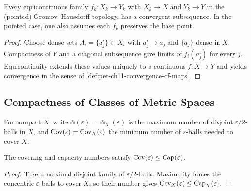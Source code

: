 \begin{lemma}
  \label{lem:pet-ch11-arzela-ascoli-gh}
  Every equicontinuous family $f_k:X_k\to Y_k$ with $X_k\to X$ and $Y_k\to Y$
  in the (pointed) Gromov--Hausdorff topology, has a convergent subsequence.
  In the pointed case, one also assumes each $f_k$ preserves the base point.
\end{lemma}
\begin{proof}
  \sketch
  Choose dense sets \(A_i=\{a_j^i\}\subset X_i\) with \(a_j^i\to a_j\) and \(\{a_j\}\) dense in \(X\). Compactness of \(Y\) and a diagonal subsequence give limits of \(f_i(a_j^i)\) for every \(j\). Equicontinuity extends these values uniquely to a continuous \(f:X\to Y\) and yields convergence in the sense of \cref{def:pet-ch11-convergence-of-maps}.
\end{proof}


\subsection{Compactness of Classes of Metric Spaces}

\begin{definition}
  \label{def:pet-ch11-capacity-covering-functions}
  For compact $X$, write
  $\Cap(\varepsilon)=\Cap_X(\varepsilon)$ is the maximum number of disjoint
  $\varepsilon/2$-balls in $X$, and $\operatorname{Cov}(\varepsilon)=\operatorname{Cov}_X(\varepsilon)$
  the minimum number of $\varepsilon$-balls needed to cover $X$.
\end{definition}

\begin{lemma}
  \label{lem:pet-ch11-cov-le-cap}
  The covering and capacity numbers satisfy
  $\operatorname{Cov}(\varepsilon)\le\operatorname{Cap}(\varepsilon)$.
\end{lemma}
\begin{proof}
  \sketch
  Take a maximal disjoint family of \(\varepsilon/2\)-balls. Maximality forces
  the concentric \(\varepsilon\)-balls to cover \(X\), so their number gives
  \(\operatorname{Cov}_X(\varepsilon)\le\operatorname{Cap}_X(\varepsilon)\).
\end{proof}


